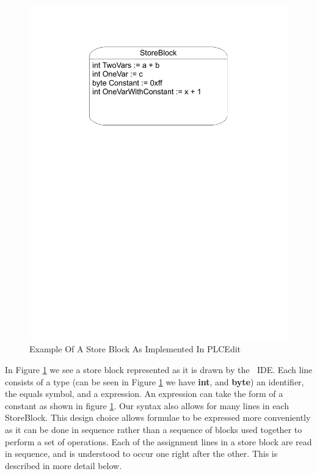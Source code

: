 \begin{figure}[htp]
    \centering
    \includegraphics[trim= 20mm 175mm 20mm 10mm, clip, width=\imgmedium]{./images/state_storeblock.pdf}
    \caption{Example Of A Store Block As Implemented In PLCEdit}
    \label{fig:state_storeblock}
\end{figure}

In Figure \ref{fig:state_storeblock} we see a store block represented as it is drawn by the \plcchart $\:$ IDE. Each line consists of a type (can be seen in Figure \ref{fig:state_storeblock} we have \textbf{int}, and \textbf{byte}) an identifier, the equals symbol, and a expression. An expression can take the form of a constant as shown in figure \ref{fig:state_storeblock}. Our syntax also allows for many lines in each StoreBlock. This design choice allows formulae to be expressed more conveniently as it can be done in sequence rather than a sequence of blocks used together to perform a set of operations.
Each of the assignment lines in a store block are read in sequence, and is understood to occur one right after the other. This is described in more detail below.

